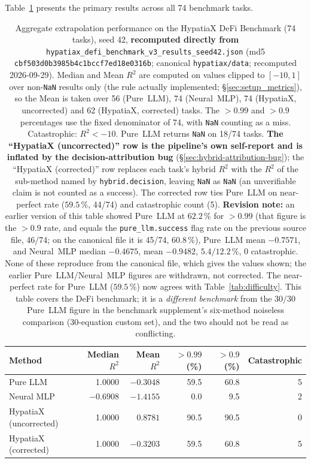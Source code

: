 \documentclass[twoside,11pt]{article}
\newcommand{\Rsq}{R^{2}}
\begin{document}
Table~\ref{tab:main_results} presents the primary results across all 74 benchmark tasks.

\begin{table}[h]
\centering
\caption{Aggregate extrapolation performance on the HypatiaX DeFi Benchmark (74 tasks),
seed 42, \textbf{recomputed directly from}
\texttt{hypatiax\_defi\_benchmark\_v3\_results\_seed42.json} (md5
\texttt{cbf503d0b3985b4c1bccf7ed18e0316b}; canonical \texttt{hypatiax/data}; recomputed 2026-09-29).
Median and Mean $\Rsq$ are computed on values clipped to $[-10,1]$ over
non-\texttt{NaN} results only (the rule actually implemented; \S\ref{sec:setup_metrics}),
so the Mean is taken over 56 (Pure~LLM), 74 (Neural~MLP), 74 (HypatiaX, uncorrected)
and 62 (HypatiaX, corrected) tasks. The $>0.99$ and $>0.9$ percentages use the fixed denominator
of 74, with \texttt{NaN} counting as a miss. Catastrophic: $\Rsq<-10$.
Pure~LLM returns \texttt{NaN} on 18/74 tasks. \textbf{The
``HypatiaX (uncorrected)'' row is the pipeline's own self-report and is
inflated by the decision-attribution bug} (\S\ref{sec:hybrid-attribution-bug}); the
``HypatiaX (corrected)'' row replaces each task's hybrid $\Rsq$ with the
$\Rsq$ of the sub-method named by \texttt{hybrid.decision}, leaving
\texttt{NaN} as \texttt{NaN} (an unverifiable claim is not counted as a success).
The corrected row ties Pure~LLM on near-perfect rate ($59.5\,\%$, 44/74) and
catastrophic count (5). \textbf{Revision note:} an earlier version of this table showed
Pure~LLM at $62.2\,\%$ for $>0.99$ (that figure is the $>0.9$ rate,
and equals the \texttt{pure\_llm.success} flag rate on the previous source file, 46/74; on the canonical file it is 45/74, $60.8\,\%$), Pure~LLM mean $-0.7571$,
and Neural~MLP median $-0.4675$, mean $-0.9482$, $5.4/12.2\,\%$, 0 catastrophic.
None of these reproduce from the canonical file, which gives the values
shown; the earlier Pure~LLM/Neural~MLP figures are withdrawn, not corrected.
The near-perfect rate for Pure~LLM ($59.5\,\%$) now agrees with
Table~\ref{tab:difficulty}. This table
covers the DeFi benchmark; it is a \emph{different benchmark} from the $30/30$ Pure~LLM
figure in the benchmark supplement's six-method noiseless comparison
(30-equation custom set), and the two should not be read as conflicting.}
\label{tab:main_results}
\begin{tabular}{lrrrrr}
\toprule
Method & Median $\Rsq$ & Mean $\Rsq$ & $>0.99$ (\%) & $>0.9$ (\%) & Catastrophic \\
\midrule
Pure LLM & 1.0000 & $-0.3048$ & 59.5 & 60.8 & 5 \\
Neural MLP    & $-0.6908$ & $-1.4155$ & 0.0  & 9.5 & 2 \\
HypatiaX (uncorrected) & 1.0000 & $0.8781$ & 90.5 & 90.5 & 0 \\
HypatiaX (corrected) & 1.0000 & $-0.3203$ & 59.5 & 60.8 & 5 \\
\bottomrule
\end{tabular}
\end{table}
\end{document}
